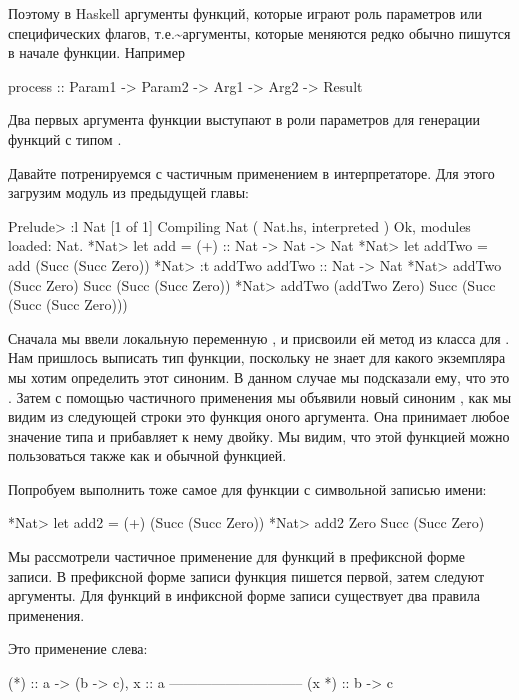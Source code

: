 Поэтому в Haskell аргументы функций, которые играют роль параметров или
специфических флагов, т.е.\textasciitilde{}аргументы, которые меняются
редко обычно пишутся в начале функции. Например


\begin{code}
process :: Param1 -> Param2 -> Arg1 -> Arg2 -> Result
\end{code}

Два первых аргумента функции  выступают в роли параметров
для генерации функций с типом .

Давайте потренируемся с частичным применением в интерпретаторе. Для
этого загрузим модуль  из предыдущей главы:


\begin{code}
Prelude> :l Nat
[1 of 1] Compiling Nat              ( Nat.hs, interpreted )
Ok, modules loaded: Nat.
*Nat> let add = (+) :: Nat -> Nat -> Nat
*Nat> let addTwo = add (Succ (Succ Zero))
*Nat> :t addTwo
addTwo :: Nat -> Nat
*Nat> addTwo (Succ Zero)
Succ (Succ (Succ Zero))
*Nat> addTwo (addTwo Zero)
Succ (Succ (Succ (Succ Zero)))
\end{code}

Сначала мы ввели локальную переменную , и присвоили ей метод
\In{(+)} из класса  для . Нам пришлось выписать тип
функции, поскольку  не знает для какого экземпляра мы хотим
определить этот синоним. В данном случае мы подсказали ему, что это
. Затем с помощью частичного применения мы объявили новый
синоним , как мы видим из следующей строки это функция оного
аргумента. Она принимает любое значение типа  и прибавляет к
нему двойку. Мы видим, что этой функцией можно пользоваться также как и
обычной функцией.

Попробуем выполнить тоже самое для функции с символьной записью имени:


\begin{code}
*Nat> let add2 = (+) (Succ (Succ Zero))
*Nat> add2 Zero
Succ (Succ Zero)
\end{code}

Мы рассмотрели частичное применение для функций в префиксной форме
записи. В префиксной форме записи функция пишется первой, затем следуют
аргументы. Для функций в инфиксной форме записи существует два правила
применения.

Это применение слева:


\begin{code}
                    (*) :: a -> (b -> c),   x :: a
                    -----------------------------
                            (x *) :: b -> c
\end{code}

